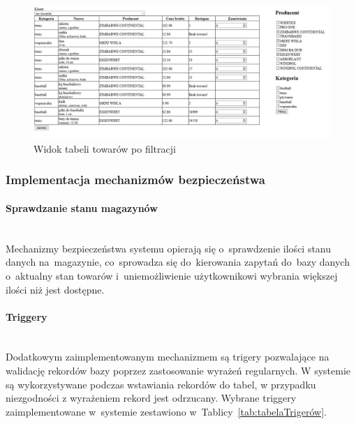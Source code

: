 \documentclass[a4paper, 12pt]{article}
\begin{document}
\begin{figure}[H]
	\centering
	\includegraphics[width=14cm]{Screeny/Filtrowanie2.JPG}
	\caption[Widok tabeli towarów po filtracji]{Widok tabeli towarów po filtracji}
	\label{fig:rezultatFiltracji}
\end{figure}

\subsubsection{Implementacja mechanizmów bezpieczeństwa}
\paragraph{Sprawdzanie stanu magazynów} \mbox{}\\
Mechanizmy bezpieczeństwa systemu opierają się o~sprawdzenie ilości stanu danych na~magazynie, co~sprowadza się do~kierowania zapytań do~bazy danych o~aktualny stan towarów i~uniemożliwienie użytkownikowi wybrania większej ilości niż jest dostępne.
\paragraph{Triggery} \mbox{}\\
Dodatkowym zaimplementowanym mechanizmem są trigery pozwalające na walidację rekordów bazy poprzez zastosowanie wyrażeń regularnych. W systemie są wykorzystywane podczas wstawiania rekordów do tabel, w przypadku niezgodności z wyrażeniem rekord jest odrzucany. Wybrane triggery zaimplementowane w~systemie zestawiono w~Tablicy~\ref{tab:tabelaTrigerów}.
\end{document}
